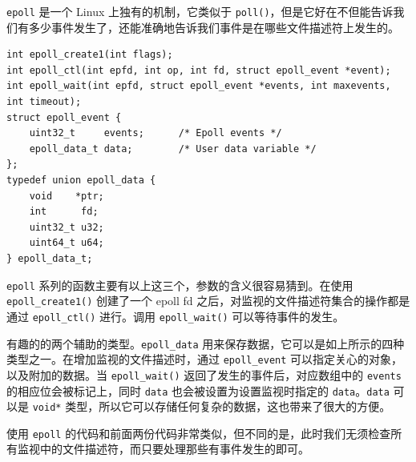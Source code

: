 \documentclass[a4paper]{article}
\begin{document}
\texttt{epoll} 是一个 Linux 上独有的机制，它类似于 \texttt{poll()}，但是它好在不但能告诉我们有多少事件发生了，还能准确地告诉我们事件是在哪些文件描述符上发生的。

\begin{verbatim}
int epoll_create1(int flags);
int epoll_ctl(int epfd, int op, int fd, struct epoll_event *event);
int epoll_wait(int epfd, struct epoll_event *events, int maxevents, int timeout);
struct epoll_event {
    uint32_t     events;      /* Epoll events */
    epoll_data_t data;        /* User data variable */
};
typedef union epoll_data {
    void    *ptr;
    int      fd;
    uint32_t u32;
    uint64_t u64;
} epoll_data_t;
\end{verbatim}

\texttt{epoll} 系列的函数主要有以上这三个，参数的含义很容易猜到。在使用 \texttt{epoll\_create1()} 创建了一个 epoll fd 之后，对监视的文件描述符集合的操作都是通过 \texttt{epoll\_ctl()} 进行。调用 \texttt{epoll\_wait()} 可以等待事件的发生。

有趣的的两个辅助的类型。\texttt{epoll\_data} 用来保存数据，它可以是如上所示的四种类型之一。在增加监视的文件描述时，通过 \texttt{epoll\_event} 可以指定关心的对象，以及附加的数据。当 \texttt{epoll\_wait()} 返回了发生的事件后，对应数组中的 \texttt{events} 的相应位会被标记上，同时 \texttt{data} 也会被设置为设置监视时指定的 \texttt{data}。\texttt{data} 可以是 \texttt{void*} 类型，所以它可以存储任何复杂的数据，这也带来了很大的方便。

使用 \texttt{epoll} 的代码和前面两份代码非常类似，但不同的是，此时我们无须检查所有监视中的文件描述符，而只要处理那些有事件发生的即可。
\end{document}
